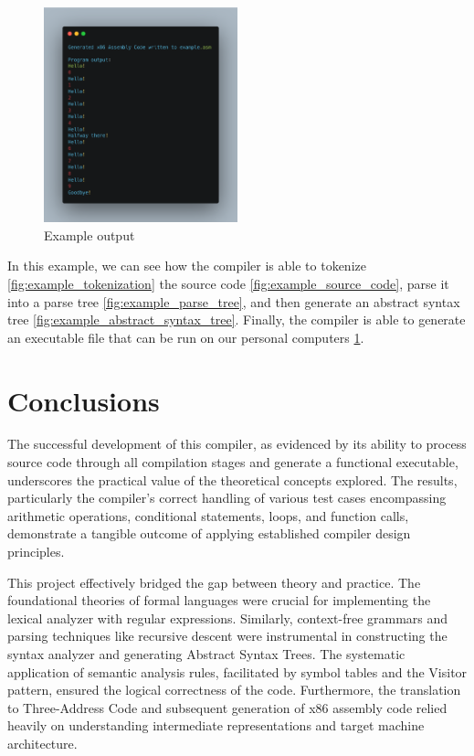 \documentclass[12pt, letterpaper]{article}
\begin{document}
\begin{figure}[H]
    \centering
    \includegraphics[width=0.5\textwidth]{6.png}
    \caption{Example output}
    \label{fig:example_output}
\end{figure}

In this example, we can see how the compiler is able to tokenize \ref{fig:example_tokenization} the source code \ref{fig:example_source_code}, parse it into a parse tree \ref{fig:example_parse_tree}, and then generate an abstract syntax tree \ref{fig:example_abstract_syntax_tree}. Finally, the compiler is able to generate an executable file that can be run on our personal computers \ref{fig:example_output}.

\section{Conclusions}

The successful development of this compiler, as evidenced by its ability to process source code through all compilation stages and generate a functional executable, underscores the practical value of the theoretical concepts explored. The results, particularly the compiler's correct handling of various test cases encompassing arithmetic operations, conditional statements, loops, and function calls, demonstrate a tangible outcome of applying established compiler design principles.

This project effectively bridged the gap between theory and practice. The foundational theories of formal languages were crucial for implementing the lexical analyzer with regular expressions. Similarly, context-free grammars and parsing techniques like recursive descent were instrumental in constructing the syntax analyzer and generating Abstract Syntax Trees. The systematic application of semantic analysis rules, facilitated by symbol tables and the Visitor pattern, ensured the logical correctness of the code. Furthermore, the translation to Three-Address Code and subsequent generation of x86 assembly code relied heavily on understanding intermediate representations and target machine architecture.
\end{document}
